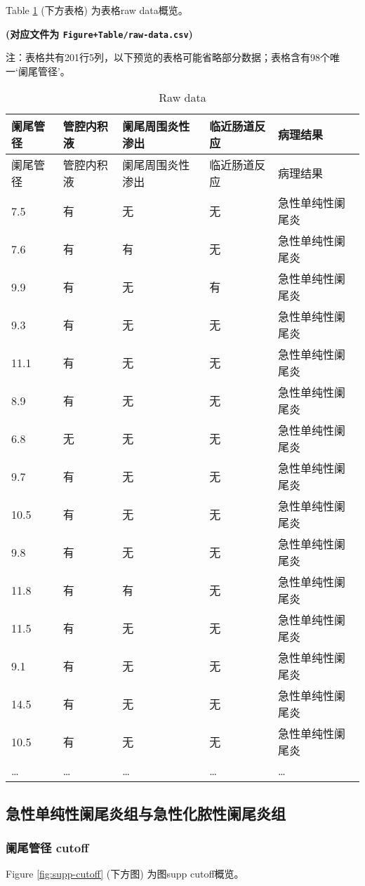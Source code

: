 \documentclass[
]{article}
\begin{document}
Table \ref{tab:raw-data} (下方表格) 为表格raw data概览。

\textbf{(对应文件为 \texttt{Figure+Table/raw-data.csv})}

\begin{center}\begin{tcolorbox}[colback=gray!10, colframe=gray!50, width=0.9\linewidth, arc=1mm, boxrule=0.5pt]注：表格共有201行5列，以下预览的表格可能省略部分数据；表格含有98个唯一`阑尾管径'。
\end{tcolorbox}
\end{center}

\begin{longtable}[]{@{}lllll@{}}
\caption{\label{tab:raw-data}Raw data}\tabularnewline
\toprule
阑尾管径 & 管腔内积液 & 阑尾周围炎性渗出 & 临近肠道反应 & 病理结果\tabularnewline
\midrule
\endfirsthead
\toprule
阑尾管径 & 管腔内积液 & 阑尾周围炎性渗出 & 临近肠道反应 & 病理结果\tabularnewline
\midrule
\endhead
7.5 & 有 & 无 & 无 & 急性单纯性阑尾炎\tabularnewline
7.6 & 有 & 有 & 无 & 急性单纯性阑尾炎\tabularnewline
9.9 & 有 & 无 & 有 & 急性单纯性阑尾炎\tabularnewline
9.3 & 有 & 无 & 无 & 急性单纯性阑尾炎\tabularnewline
11.1 & 有 & 无 & 无 & 急性单纯性阑尾炎\tabularnewline
8.9 & 有 & 无 & 无 & 急性单纯性阑尾炎\tabularnewline
6.8 & 无 & 无 & 无 & 急性单纯性阑尾炎\tabularnewline
9.7 & 有 & 无 & 无 & 急性单纯性阑尾炎\tabularnewline
10.5 & 有 & 无 & 无 & 急性单纯性阑尾炎\tabularnewline
9.8 & 有 & 无 & 无 & 急性单纯性阑尾炎\tabularnewline
11.8 & 有 & 有 & 无 & 急性单纯性阑尾炎\tabularnewline
11.5 & 有 & 无 & 无 & 急性单纯性阑尾炎\tabularnewline
9.1 & 有 & 无 & 无 & 急性单纯性阑尾炎\tabularnewline
14.5 & 有 & 无 & 无 & 急性单纯性阑尾炎\tabularnewline
10.5 & 有 & 无 & 无 & 急性单纯性阑尾炎\tabularnewline
\ldots{} & \ldots{} & \ldots{} & \ldots{} & \ldots{}\tabularnewline
\bottomrule
\end{longtable}

\hypertarget{supp}{%
\subsection{急性单纯性阑尾炎组与急性化脓性阑尾炎组}\label{supp}}

\hypertarget{ux9611ux5c3eux7ba1ux5f84-cutoff}{%
\subsubsection{阑尾管径 cutoff}\label{ux9611ux5c3eux7ba1ux5f84-cutoff}}

Figure \ref{fig:supp-cutoff} (下方图) 为图supp cutoff概览。
\end{document}

